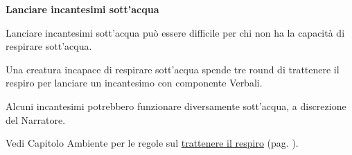 \begin{multicols}{2}
\textbf{Lanciare incantesimi sott'acqua}

Lanciare incantesimi sott'acqua può essere difficile per chi non ha la capacità di respirare sott'acqua.

Una creatura incapace di respirare sott'acqua spende tre round di trattenere il respiro per lanciare un incantesimo con componente Verbali.

Alcuni incantesimi potrebbero funzionare diversamente sott'acqua, a discrezione del Narratore.

Vedi Capitolo Ambiente per le regole sul \hyperlink{trattenereilfiato}{trattenere il respiro} (pag. \pageref{trattenereilfiato}).

\end{multicols}

\pagebreak

